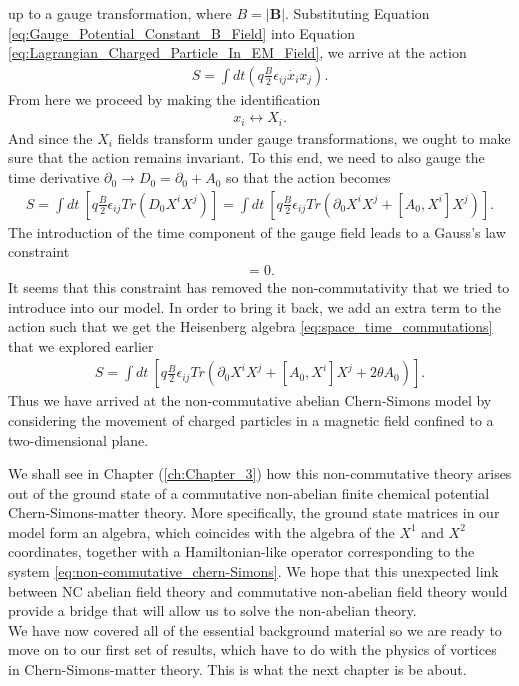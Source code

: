     up to a gauge transformation, where $B= |\bm{B}|$.
    Substituting Equation \eqref{eq:Gauge_Potential_Constant_B_Field}  into Equation \eqref{eq:Lagrangian_Charged_Particle_In_EM_Field}, we arrive at the action
    \begin{align}
        S = \int dt \left( q \frac{B}{2}\epsilon_{i j} \dot{x_i} x_j \right).
    \end{align}
    From here we proceed by making the identification
    \begin{align}
        x_i \leftrightarrow X_i.
    \end{align}
    And since the $X_i$ fields transform under gauge transformations, we ought to make sure that the action remains invariant. To this end, we need to also gauge the time derivative $\partial_0 \rightarrow D_0 = \partial_0 +A_0$ so that the action becomes
    \begin{align}
        S = \int dt \ \left[ q \frac{B}{2} \epsilon_{ij} Tr \left(D_0 X^i X^j \right) \right] = \int dt \ \left[ q \frac{B}{2} \epsilon_{ij} Tr \left(\partial_0 X^i X^j + [A_0, X^i] X^j \right) \right].
    \end{align}
    The introduction of the time component of the gauge field leads to a Gauss's law constraint
    \begin{align}
        [X^1, X^2] =0.
    \end{align}
    It seems that this constraint has removed the non-commutativity that we tried to introduce into our model. In order to bring it back, we add an extra term to the action such that we get the Heisenberg algebra \eqref{eq:space_time_commutations} that we explored earlier
    \begin{align}
        S =\int dt \ \left[ q \frac{B}{2} \epsilon_{ij} Tr \left(\partial_0 X^i X^j + [A_0, X^i] X^j + 2 \theta A_0 \right) \right]. \label{eq:non-commutative_chern-Simons}
    \end{align}
    Thus we have arrived at the non-commutative abelian Chern-Simons model by considering the movement of charged particles in a magnetic field confined to a two-dimensional plane.


We shall see in Chapter (\ref{ch:Chapter_3}) how this non-commutative theory arises out of the ground state of a commutative non-abelian finite chemical potential Chern-Simons-matter theory. More specifically, the ground state matrices in our model form an algebra, which coincides with the algebra of the $X^1$ and $X^2$ coordinates, together with a Hamiltonian-like operator corresponding to the system \eqref{eq:non-commutative_chern-Simons}. We hope that this unexpected link between NC abelian field theory and commutative non-abelian field theory would provide a bridge that will allow us to solve the non-abelian theory.\\
 \indent We have now covered all of the essential background material so we are ready to move on to our first set of results, which have to do with the physics of vortices in Chern-Simons-matter theory. This is what the next chapter is be about. 

    

